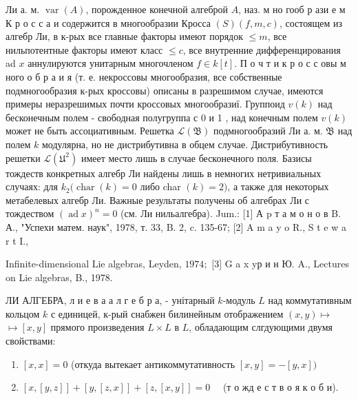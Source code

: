 \documentclass[10pt]{article}
\begin{document}
Ли а. м. $\operatorname{var}(A)$, порожденное конечной алгеброй $A$, наз. м но гооб р ази е м К р о с с а и содержится в многообразии Кросса $(S)(f, m, c)$, состоящем из алгебр Ли, в к-рых все главные факторы имеют порядок $\leqslant m$, все нильпотентные факторы имеют класс $\leqslant c$, все внутренние дифференцирования ad $x$ аннулируются унитарным многочленом $f \in k[t]$. П о ч т и к р о с с овы м ного о б р а и я (т. е. некроссовы многообразия, все собственные подмногообразия к-рых кроссовы) описаны в разрешимом случае, имеются примеры неразрешимых почти кроссовых многообразиї. Группоид $v(k)$ над бесконечным полем - свободная полугруппа с 0 и 1 , над конечным полем $v(k)$ может не быть ассоциативным. Решетка $\mathscr{L}(\mathfrak{B})$ подмногообразий Ли а. м. $\mathfrak{B}$ над полем $k$ модулярна, но не дистрибутивна в обцем случае. Дистрибутивность решетки $\mathscr{L}\left(\mathfrak{U}^{2}\right)$ имеет место лишь в случае бесконечного поля. Базисы тождеств конкретных алгебр Ли найдены лишь в немногих нетривиальных случаях: для $k_{2}(\operatorname{char}(k)=0$ либо char $(k)=2)$, а также для некоторых метабелевых алгебр Ли. Важные результаты получены об алгебрах Ли с тождеством $(\operatorname{ad} x)^{n}=0$ (см. Ли нильалгебра). Jum.: [1] А p т а м о н о в B. А., "Успехи матем. наук", 1978, т. 33, B. 2, c. 135-67; [2] A m a y o R., S t e w a r t I.,

Infinite-dimensional Lie algebras, Leyden, $1974 ;$ [3] G a x yр и н Ю. A., Lectures on Lie algebras, B., 1978.



ЛИ АЛГЕБРА, л и е в а а л г е б р а, - унітарный $k$-модуль $L$ над коммутативным кольцом $k$ с единицей, к-рый снабжен билинейным отображением $(x, y) \longmapsto$ $\longmapsto[x, y]$ прямого произведения $L \times L$ в $L$, обладающим слгдующими двумя свойствами:



\begin{enumerate}

  \item $[x, x]=0$ (откуда вытекает антикоммутативность $[x, y]=-[y, x])$



  \item $[x,[y, z]]+[y,[z, x]]+[z,[x, y]]=0 \quad$ (т о жд е с т в о я к о б и).



\end{enumerate}
\end{document}
